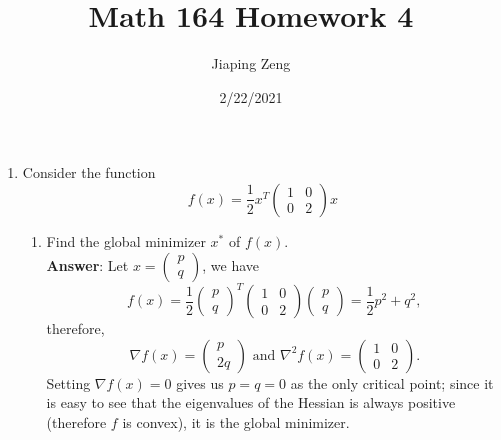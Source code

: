 \documentclass{article}
\title{Math 164 Homework 4}
\date{2/22/2021}
\author{Jiaping Zeng}
\begin{document}
\maketitle

\begin{enumerate}
      \item Consider the function \[f(x)=\dfrac{1}{2}x^T\begin{pmatrix}1&0\\0&2\end{pmatrix}x\]
            \begin{enumerate}
                  \item Find the global minimizer $x^*$ of $f(x)$.\\
                        \textbf{Answer}: Let $x=\begin{pmatrix}
                                    p \\q
                              \end{pmatrix}$, we have \[
                              f(x)=\dfrac{1}{2}\begin{pmatrix}
                                    p \\q
                              \end{pmatrix}^T\begin{pmatrix}
                                    1 & 0 \\0&2
                              \end{pmatrix}\begin{pmatrix}
                                    p \\q
                              \end{pmatrix}=\dfrac{1}{2}p^2+q^2,
                        \] therefore, \[
                              \nabla f(x)=\begin{pmatrix}
                                    p \\2q
                              \end{pmatrix}
                              \text{ and }
                              \nabla^2 f(x)=\begin{pmatrix}
                                    1 & 0 \\
                                    0 & 2
                              \end{pmatrix}.
                        \] Setting $\nabla f(x)=0$ gives us $p=q=0$ as the only critical point; since it is easy to see that the eigenvalues of the Hessian is always positive (therefore $f$ is convex), it is the global minimizer.

\end{enumerate}
\end{enumerate}
\end{document}
